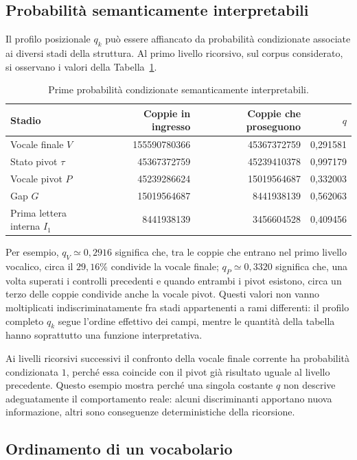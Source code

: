 \documentclass[11pt,a4paper]{article}
\theoremstyle{definition}
\theoremstyle{remark}
\begin{document}
\subsection{Probabilità semanticamente interpretabili}

Il profilo posizionale $q_k$ può essere affiancato da probabilità condizionate associate ai diversi stadi della struttura. Al primo livello ricorsivo, sul corpus considerato, si osservano i valori della Tabella~\ref{tab:q-semantiche}.

\begin{table}[htbp]
\centering
\caption{Prime probabilità condizionate semanticamente interpretabili.}
\label{tab:q-semantiche}
\begin{tabular}{lrrr}
\toprule
Stadio & Coppie in ingresso & Coppie che proseguono & $q$ \\
\midrule
Vocale finale $V$ & 155590780366 & 45367372759 & 0,291581 \\
Stato pivot $\tau$ & 45367372759 & 45239410378 & 0,997179 \\
Vocale pivot $P$ & 45239286624 & 15019564687 & 0,332003 \\
Gap $G$ & 15019564687 & 8441938139 & 0,562063 \\
Prima lettera interna $I_1$ & 8441938139 & 3456604528 & 0,409456 \\
\bottomrule
\end{tabular}
\end{table}

Per esempio, $q_V\simeq0{,}2916$ significa che, tra le coppie che entrano nel primo livello vocalico, circa il $29{,}16\%$ condivide la vocale finale; $q_P\simeq0{,}3320$ significa che, una volta superati i controlli precedenti e quando entrambi i pivot esistono, circa un terzo delle coppie condivide anche la vocale pivot. Questi valori non vanno moltiplicati indiscriminatamente fra stadi appartenenti a rami differenti: il profilo completo $q_k$ segue l'ordine effettivo dei campi, mentre le quantità della tabella hanno soprattutto una funzione interpretativa.

Ai livelli ricorsivi successivi il confronto della vocale finale corrente ha probabilità condizionata $1$, perché essa coincide con il pivot già risultato uguale al livello precedente. Questo esempio mostra perché una singola costante $q$ non descrive adeguatamente il comportamento reale: alcuni discriminanti apportano nuova informazione, altri sono conseguenze deterministiche della ricorsione.

\subsection{Ordinamento di un vocabolario}
\end{document}
